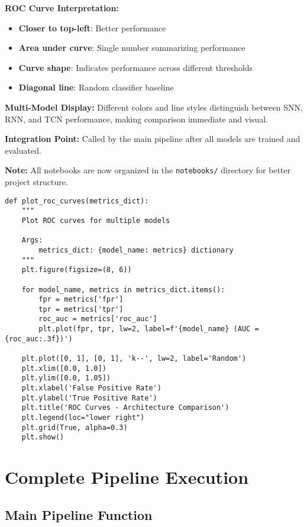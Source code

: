 \documentclass[12pt,a4paper]{article}
\begin{document}
\textbf{ROC Curve Interpretation:}
\begin{itemize}
    \item \textbf{Closer to top-left}: Better performance
    \item \textbf{Area under curve}: Single number summarizing performance
    \item \textbf{Curve shape}: Indicates performance across different thresholds
    \item \textbf{Diagonal line}: Random classifier baseline
\end{itemize}

\textbf{Multi-Model Display:} Different colors and line styles distinguish between SNN, RNN, and TCN performance, making comparison immediate and visual.

\textbf{Integration Point:} Called by the main pipeline after all models are trained and evaluated.

\textbf{Note:} All notebooks are now organized in the \texttt{notebooks/} directory for better project structure.

\begin{lstlisting}[caption={ROC Curve Comparison - Visual Performance Analysis}]
def plot_roc_curves(metrics_dict):
    """
    Plot ROC curves for multiple models

    Args:
        metrics_dict: {model_name: metrics} dictionary
    """
    plt.figure(figsize=(8, 6))

    for model_name, metrics in metrics_dict.items():
        fpr = metrics['fpr']
        tpr = metrics['tpr']
        roc_auc = metrics['roc_auc']
        plt.plot(fpr, tpr, lw=2, label=f'{model_name} (AUC = {roc_auc:.3f})')

    plt.plot([0, 1], [0, 1], 'k--', lw=2, label='Random')
    plt.xlim([0.0, 1.0])
    plt.ylim([0.0, 1.05])
    plt.xlabel('False Positive Rate')
    plt.ylabel('True Positive Rate')
    plt.title('ROC Curves - Architecture Comparison')
    plt.legend(loc="lower right")
    plt.grid(True, alpha=0.3)
    plt.show()
\end{lstlisting}

\section{Complete Pipeline Execution}

\subsection{Main Pipeline Function}
\end{document}
